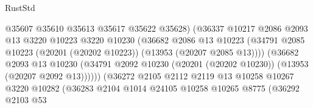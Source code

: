 \begin{lexlean}{RustStd}
\begin{coremodule}
                                          @35607
                                          @35610
                                          @35613
                                          @35617
                                          @35622
                                          @35628)
                                        (@36337
                                          @10217
                                          @2086
                                          @2093
                                          @13
                                          @3220
                                          @10223
                                          @3220
                                          @10230
                                          (@36682
                                            @2086
                                            @13
                                            @10223
                                            (@34791
                                              @2085
                                              @10223
                                              (@20201 (@20202 @10223))
                                              (@13953 (@20207 @2085 @13))))
                                          (@36682
                                            @2093
                                            @13
                                            @10230
                                            (@34791
                                              @2092
                                              @10230
                                              (@20201 (@20202 @10230))
                                              (@13953 (@20207 @2092 @13))))))
                                      (@36272
                                        @2105
                                        @2112
                                        @2119
                                        @13
                                        @10258
                                        @10267
                                        @3220
                                        @10282
                                        (@36283
                                          @2104
                                          @1014
                                          @24105
                                          @10258
                                          @10265
                                          @8775
                                          (@36292
                                            @2103
                                            @53

\end{coremodule}
\end{lexlean}
